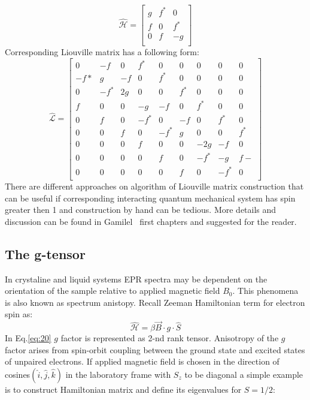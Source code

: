 \begin{equation}\label{eq:hamliv}
\hat{\mathcal{H}} = \begin{bmatrix}
       g & f^* & 0 \\[0.3em]
       f & 0 & f^* \\[0.3em]
       0 & f & -g \\[0.3em]
     \end{bmatrix}
\end{equation}
Corresponding Liouville matrix has a following form: 
\begin{equation}\label{spinoneliv}
\hat{\mathcal{L}} = \begin{bmatrix}
       0 & -f & 0 & f^* &0 & 0 & 0 & 0 & 0         \\[0.3em]
       -f* & g  & -f   & 0 &f^* & 0  & 0   & 0 & 0         \\[0.3em]
       0 & -f^*  & 2g   & 0 &0 & f^*  & 0   & 0 & 0         \\[0.3em]
       f & 0  & 0   & -g &-f & 0  & f^*   & 0 & 0         \\[0.3em]
       0 & f  & 0   & -f^* &0 & -f  & 0   & f^* & 0         \\[0.3em]
       0 & 0  & f   & 0 &-f^* & g  & 0   & 0 & f^*         \\[0.3em]
       0 & 0  & 0   & f &0 & 0  & -2g   & -f & 0         \\[0.3em]
       0 & 0  & 0   & 0 &f & 0  & -f^*   & -g & f-         \\[0.3em]
       0 & 0  & 0   & 0 &0 & f  & 0   & -f^* & 0         \\[0.3em]
     \end{bmatrix}
\end{equation}
There are different approaches on algorithm of Liouville matrix construction that can be useful if corresponding interacting quantum mechanical system has spin greater then 1 and construction by hand can be tedious. More details and discussion can be found in Gamilel~\cite{gam} first chapters and suggested for the reader.   
\subsection{The g-tensor}\label{gtensorsection}
In crystaline and liquid systems EPR spectra may be dependent on the orientation of the sample relative to applied magnetic field $B_0$. This phenomena is also known as spectrum anistopy. Recall Zeeman Hamiltonian term for electron spin as: 
\begin{equation}\label{eq:20}
\mathcal{\hat{H}}=\beta \vec{B}\cdot g \cdot \hat{S}
\end{equation} 
In Eq.\ref{eq:20} $g$ factor is represented as 2-nd rank tensor. Anisotropy of the $g$ factor arises from spin-orbit coupling between the ground state and excited states of unpaired electrons. If applied magnetic field is chosen in the direction of cosines$(\hat{i},\hat{j},\hat{k})$ in the laboratory frame with $S_z$ to be diagonal a simple example is to construct Hamiltonian matrix and define its eigenvalues for $S=1/2$:

